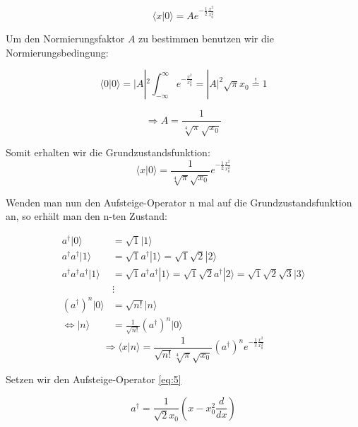 \begin{equation}
  \label{eq:35}
  \langle x |0\rangle = A e^{-\frac{1}{2}\frac{x^2}{x_0^2}}
\end{equation}

Um den Normierungsfaktor \(A\) zu bestimmen benutzen wir die Normierungsbedingung:

\begin{equation}
  \label{eq:36}
\langle 0|0\rangle  = |A|^2 \int_{-\infty}^{\infty} e^{-\frac{x^2}{x_0^2}} = |A|^2 \sqrt{\pi}x_0 \stackrel{!}= 1
\end{equation}

\begin{equation}
  \label{eq:37}
  \Rightarrow A = \frac{1}{\sqrt[4]{\pi}\sqrt{x_0}}
\end{equation}

Somit erhalten wir die Grundzustandsfunktion:
\begin{equation}
  \label{eq:38}
   \langle x |0\rangle = \frac{1}{\sqrt[4]{\pi}\sqrt{x_0}} e^{-\frac{1}{2}\frac{x^2}{x_0^2}}
\end{equation}

Wenden man nun den Aufsteige-Operator n mal auf die Grundzustandsfunktion an, so erhält man den n-ten Zustand:


\begin{align}
  \label{eq:39}
  a^\dagger|0\rangle&=\sqrt 1 |1\rangle \\
 a^\dagger a^\dagger|1\rangle &= \sqrt 1 a^\dagger|1\rangle = \sqrt 1 \sqrt 2 |2\rangle\\
 a^\dagger a^\dagger a^\dagger|1\rangle &= \sqrt 1 a^\dagger a^\dagger|1\rangle = \sqrt 1 \sqrt 2  a^\dagger |2\rangle
                             =\sqrt 1 \sqrt 2  \sqrt 3 |3\rangle\\
 &\vdots\\
 (a^\dagger)^n|0\rangle  &= \sqrt{n!}|n\rangle\\
 \Leftrightarrow |n\rangle &=\frac{1}{\sqrt{n!}}(a^\dagger)^n|0\rangle
\end{align}
\begin{equation}
  \label{eq:40}
   \Rightarrow \langle x |n\rangle = \frac{1}{\sqrt{n!}\sqrt[4]{\pi}\sqrt{x_0}} (a^\dagger)^n e^{-\frac{1}{2}\frac{x^2}{x_0^2}}
\end{equation}

Setzen wir den Aufsteige-Operator \eqref{eq:5}

\begin{equation}
  \label{eq:41}
  a^\dagger = \frac{1}{\sqrt{2}x_0}\left( x - x_0^2 \frac{d}{dx}\right)
\end{equation}

